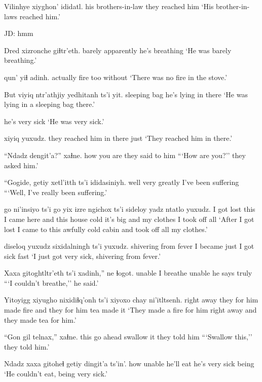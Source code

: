 \documentclass[12pt]{article}
\begin{document}
\gll Vilinhye {xiyghon' ididatl. }
{his brothers-in-law} {they reached him}
\glt `His brother-in-laws reached him.'
\glend

JD:  hmm

\gll Dred xizronche giɬtr'eth.
barely  apparently     { he's breathing}
\glt `He was barely breathing.'
\glend

 qun' yiɬ adinh. 
actually    fire too without
\glt `There was no fire in the stove.'
\glend

\gll But {viyiq ntr'athjiy} yedhitanh ts'i yit.
{} {sleeping bag}     {he's lying in} {}  there
\glt `He was lying in a sleeping bag there.'
\glend

{{he's very sick}}
\glt `He was very sick.'
\glend

 {xiyiq} yuxudz.
{they reached him}    {in there}    just
\glt `They reached him in there.'
\glend

\gll ``Ndadz dengit'a?'' xaɬne.
how   {you are}  {they said to him}
\glt ```How are you?'' they asked him.'
\glend

\gll ``Gogide, getiy {xetl'itth ts'i} ididasiniyh.
well     very  greatly        {I've been suffering}
\glt ```Well, I've really been suffering.'
\glend

 go    ni'insiyo ts'i    go yix izre ngichox ts'i sideloy    {yadz ntatlo} yuxudz.
{I got lost}          this {I came here} and this house cold {it's big} and {my clothes} {I took off}  all
\glt `After I got lost I came to this awfully cold cabin and took off all my clothes.'
\glend

 diseloq yuxudz sixidalningh ts'i yuxudz.
{shivering from fever}  {I became} just  {I got sick fast}
\glt `I just got very sick, shivering from fever.' %
\glend

\gll Xaxa gitoghtltr'eth ts'i xadinh,'' ne ɬogot.
unable {I breathe} {}  unable {he says} truly
\glt ```I couldn't breathe,'' he said.'
\glend

\gll Yitoyigg     xiyugho      nixidiɬq'onh ts'i xiyoxo chay ni'itltsenh. 
{right away} {they for him} {made fire} and {they for him} tea {made it}
\glt `They made a fire for him right away and they made tea for him.'
\glend

\gll ``Gon gil telnax,'' xaɬne. 
this {go ahead} {swallow it} {they told him}
\glt ```Swallow this,'' they told him.'
\glend

\gll Ndadz xaxa   gitoheɬ {getiy dingit'a} ts'in'.
how   unable {he'll eat}  {he's very sick} being
\glt `He couldn't eat, being very sick.'
\glend
\end{document}
